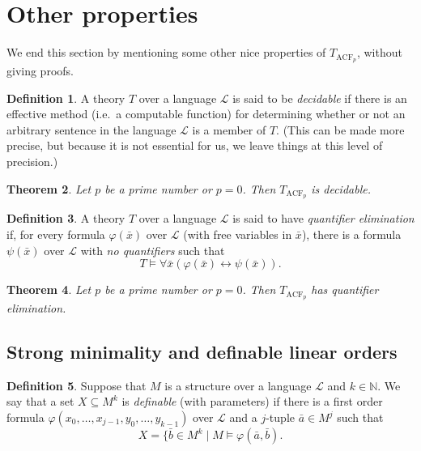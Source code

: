 \documentclass[a4paper]{memoir}
\newtheorem{theorem}{Theorem}[section]
\theoremstyle{definition}
\newtheorem{definition}[theorem]{Definition}
\newcommand{\bb}{\mathbb}
\newcommand{\mc}{\mathcal}
\begin{document}
\section{Other properties}

We end this section by mentioning some other nice properties of $T_{\mathrm{ACF}_p}$, 
without giving proofs. 

\begin{definition}
  A theory $T$ over a language $\mc{L}$ is said to be \emph{decidable} if there is an 
  effective method (i.e.\ a computable function) for determining whether or not an 
  arbitrary sentence in the language $\mc{L}$ is a member of $T$. (This can be made 
  more precise, but because it is not essential for us, we leave things at this level 
  of precision.)
\end{definition}

\begin{theorem}
  Let $p$ be a prime number or $p = 0$. Then $T_{\mathrm{ACF}_p}$ is decidable.
\end{theorem}

\begin{definition}
  A theory $T$ over a language $\mc{L}$ is said to have \emph{quantifier elimination} 
  if, for every formula $\varphi(\bar{x})$ over $\mc{L}$ (with free variables in 
  $\bar{x}$), there is a formula $\psi(\bar{x})$ over $\mc{L}$ with \emph{no quantifiers} 
  such that
  \[
    T \models \forall \bar{x} (\varphi(\bar{x}) \leftrightarrow \psi(\bar{x})).
  \]
\end{definition}

\begin{theorem}
  Let $p$ be a prime number or $p = 0$. Then $T_{\mathrm{ACF}_p}$ has quantifier 
  elimination.
\end{theorem}

\subsection{Strong minimality and definable linear orders}

\begin{definition}
  Suppose that $M$ is a structure over a language $\mc{L}$ and $k \in \bb{N}$. We 
  say that a set $X \subseteq M^k$ is \emph{definable} (with parameters) if there 
  is a first order formula $\varphi(x_0, \ldots, x_{j-1}, y_0, \ldots, y_{k-1})$ 
  over $\mc{L}$ and a $j$-tuple $\bar{a} \in M^j$ such that
  \[
    X = \{\bar{b} \in M^k \mid M \models \varphi(\bar{a}, \bar{b}).
  \]
\end{definition}
\end{document}
